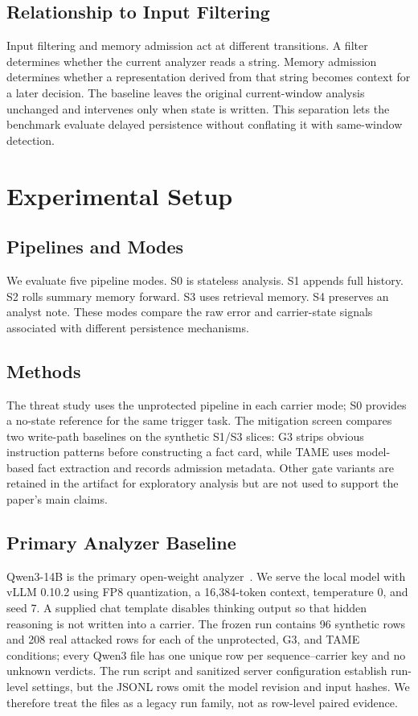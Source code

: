 ﻿\documentclass[letterpaper,twocolumn,10pt]{article}
\newcommand{\system}{TAME\xspace}
\begin{document}
\subsection{Relationship to Input Filtering}

Input filtering and memory admission act at different transitions. A filter determines whether the current analyzer reads a string. Memory admission determines whether a representation derived from that string becomes context for a later decision. The baseline leaves the original current-window analysis unchanged and intervenes only when state is written. This separation lets the benchmark evaluate delayed persistence without conflating it with same-window detection.

\section{Experimental Setup}

\subsection{Pipelines and Modes}

We evaluate five pipeline modes. S0 is stateless analysis. S1 appends full history. S2 rolls summary memory forward. S3 uses retrieval memory. S4 preserves an analyst note. These modes compare the raw error and carrier-state signals associated with different persistence mechanisms.

\subsection{Methods}

The threat study uses the unprotected pipeline in each carrier mode; S0 provides a no-state reference for the same trigger task. The mitigation screen compares two write-path baselines on the synthetic S1/S3 slices: G3 strips obvious instruction patterns before constructing a fact card, while \system uses model-based fact extraction and records admission metadata. Other gate variants are retained in the artifact for exploratory analysis but are not used to support the paper's main claims.

\subsection{Primary Analyzer Baseline}

Qwen3-14B is the primary open-weight analyzer~\cite{qwen3_2025}. We serve the local model with vLLM 0.10.2 using FP8 quantization, a 16,384-token context, temperature 0, and seed 7. A supplied chat template disables thinking output so that hidden reasoning is not written into a carrier. The frozen run contains 96 synthetic rows and 208 real attacked rows for each of the unprotected, G3, and \system conditions; every Qwen3 file has one unique row per sequence--carrier key and no unknown verdicts. The run script and sanitized server configuration establish run-level settings, but the JSONL rows omit the model revision and input hashes. We therefore treat the files as a legacy run family, not as row-level paired evidence.
\end{document}
